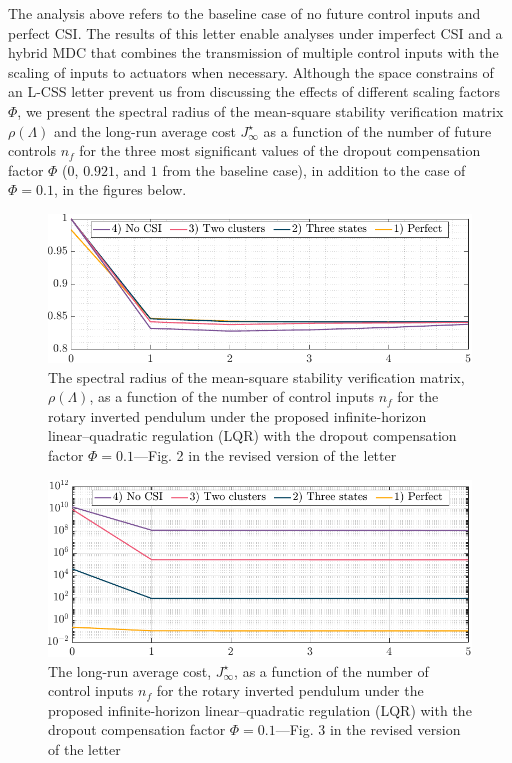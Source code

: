 {The analysis above refers to the baseline case of no future control inputs and perfect CSI. The results of this letter enable analyses under imperfect CSI and a hybrid MDC that combines the transmission of multiple control inputs with the scaling of inputs to actuators when necessary. Although the space constrains of an L-CSS letter prevent us from discussing the effects of different scaling factors $\mathit{\Phi}$, we present the spectral radius of the mean-square stability verification matrix $\rho(\mathit{\Lambda})$ and the long-run average cost $J_{\infty}^{\star}$ as a function of the number of future controls $n_f$ for the three most significant values of the dropout compensation factor $\mathit{\Phi}$ ($0$, $0.921$, and $1$ from the baseline case), in addition to the case of $\mathit{\Phi}=0.1$, in the figures below.
\begin{figure}[h!]
\begin{center}
\includegraphics[width=0.8\columnwidth]{./responses-rev-1/stability-cntrl-a.pdf}
\caption{The spectral radius of the mean-square stability verification matrix, $\rho(\mathit{\Lambda})$, as a function of the number of control inputs $n_f$ for the rotary inverted pendulum under the proposed infinite-horizon linear–quadratic regulation (LQR) with the dropout compensation factor $\mathit{\Phi}=0.1$—Fig. 2 in the revised version of the letter}\label{fig:stability-coeff-a}
\end{center}
\end{figure}
\begin{figure}[h!]
\begin{center}
\includegraphics[width=0.8\columnwidth]{./responses-rev-1/cost-cntrl-a.pdf}
\caption{The long-run average cost, $J_{\infty}^{\star}$, as a function of the number of control inputs $n_f$ for the rotary inverted pendulum under the proposed infinite-horizon linear–quadratic regulation (LQR) with the dropout compensation factor $\mathit{\Phi}=0.1$—Fig. 3 in the revised version of the letter}\label{fig:cost-cntrl-a}

\end{center}
\end{figure}}
